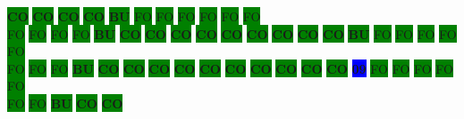 \colorbox{green}{\color[rgb]{0,0,0}\textbf{CO}}%
\colorbox{green}{\color[rgb]{0,0,0}\textbf{CO}}%
\colorbox{green}{\color[rgb]{0,0,0}\textbf{CO}}%
\colorbox{green}{\color[rgb]{0,0,0}\textbf{CO}}%
\colorbox{green}{\color[rgb]{1,0,0}\textbf{BU}}%
\colorbox{green}{\color[gray]{0.75}FO}%
\colorbox{green}{\color[gray]{0.75}FO}%
\colorbox{green}{\color[gray]{0.75}FO}%
\colorbox{green}{\color[gray]{0.75}FO}%
\colorbox{green}{\color[gray]{0.75}FO}%
\colorbox{green}{\color[gray]{0.75}FO}%
\\
\colorbox{green}{\color[gray]{0.75}FO}%
\colorbox{green}{\color[gray]{0.75}FO}%
\colorbox{green}{\color[gray]{0.75}FO}%
\colorbox{green}{\color[gray]{0.75}FO}%
\colorbox{green}{\color[rgb]{1,0,0}\textbf{BU}}%
\colorbox{green}{\color[rgb]{0,0,0}\textbf{CO}}%
\colorbox{green}{\color[rgb]{0,0,0}\textbf{CO}}%
\colorbox{green}{\color[rgb]{0,0,0}\textbf{CO}}%
\colorbox{green}{\color[rgb]{0,0,0}\textbf{CO}}%
\colorbox{green}{\color[rgb]{0,0,0}\textbf{CO}}%
\colorbox{green}{\color[rgb]{0,0,0}\textbf{CO}}%
\colorbox{green}{\color[rgb]{0,0,0}\textbf{CO}}%
\colorbox{green}{\color[rgb]{0,0,0}\textbf{CO}}%
\colorbox{green}{\color[rgb]{0,0,0}\textbf{CO}}%
\colorbox{green}{\color[rgb]{1,0,0}\textbf{BU}}%
\colorbox{green}{\color[gray]{0.75}FO}%
\colorbox{green}{\color[gray]{0.75}FO}%
\colorbox{green}{\color[gray]{0.75}FO}%
\colorbox{green}{\color[gray]{0.75}FO}%
\colorbox{green}{\color[gray]{0.75}FO}%
\\
\colorbox{green}{\color[gray]{0.75}FO}%
\colorbox{green}{\color[gray]{0.75}FO}%
\colorbox{green}{\color[gray]{0.75}FO}%
\colorbox{green}{\color[rgb]{1,0,0}\textbf{BU}}%
\colorbox{green}{\color[rgb]{0,0,0}\textbf{CO}}%
\colorbox{green}{\color[rgb]{0,0,0}\textbf{CO}}%
\colorbox{green}{\color[rgb]{0,0,0}\textbf{CO}}%
\colorbox{green}{\color[rgb]{0,0,0}\textbf{CO}}%
\colorbox{green}{\color[rgb]{0,0,0}\textbf{CO}}%
\colorbox{green}{\color[rgb]{0,0,0}\textbf{CO}}%
\colorbox{green}{\color[rgb]{0,0,0}\textbf{CO}}%
\colorbox{green}{\color[rgb]{0,0,0}\textbf{CO}}%
\colorbox{green}{\color[rgb]{0,0,0}\textbf{CO}}%
\colorbox{green}{\color[rgb]{0,0,0}\textbf{CO}}%
\colorbox{blue}{\color[rgb]{1,0,0}\textbf{09}}%
\colorbox{green}{\color[gray]{0.75}FO}%
\colorbox{green}{\color[gray]{0.75}FO}%
\colorbox{green}{\color[gray]{0.75}FO}%
\colorbox{green}{\color[gray]{0.75}FO}%
\colorbox{green}{\color[gray]{0.75}FO}%
\\
\colorbox{green}{\color[gray]{0.75}FO}%
\colorbox{green}{\color[gray]{0.75}FO}%
\colorbox{green}{\color[rgb]{1,0,0}\textbf{BU}}%
\colorbox{green}{\color[rgb]{0,0,0}\textbf{CO}}%
\colorbox{green}{\color[rgb]{0,0,0}\textbf{CO}}%
